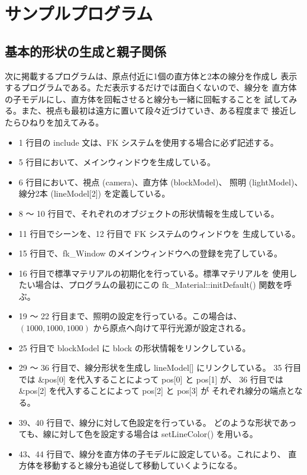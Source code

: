 \chapter{サンプルプログラム} \label{sec:sample}
\section{基本的形状の生成と親子関係}
次に掲載するプログラムは、原点付近に1個の直方体と2本の線分を作成し
表示するプログラムである。ただ表示するだけでは面白くないので、線分を
直方体の子モデルにし、直方体を回転させると線分も一緒に回転することを
試してみる。また、視点も最初は遠方に置いて段々近づけていき、ある程度まで
接近したらひねりを加えてみる。

\begin{itemize}
 \item 1 行目の include 文は、FK システムを使用する場合に必ず記述する。
 \item 5 行目において、メインウィンドウを生成している。
 \item 6 行目において、視点 (camera)、直方体 (blockModel)、
	照明 (lightModel)、線分2本 (lineModel[2]) を定義している。
 \item 8 〜 10 行目で、それぞれのオブジェクトの形状情報を生成している。
 \item 11 行目でシーンを、12 行目で FK システムのウィンドウを
	生成している。
 \item 15 行目で、fk\_Window のメインウィンドウへの登録を完了している。
 \item 16 行目で標準マテリアルの初期化を行っている。標準マテリアルを
	使用したい場合は、プログラムの最初にこの
	fk\_Material::initDefault() 関数を呼ぶ。
 \item 19 〜 22 行目まで、照明の設定を行っている。この場合は、
	\((1000, 1000, 1000)\) から原点へ向けて平行光源が設定される。
 \item 25 行目で blockModel に block の形状情報をリンクしている。
 \item 29 〜 36 行目で、線分形状を生成し lineModel[] にリンクしている。
	35 行目では \&pos[0] を代入することによって pos[0] と pos[1] が、
	36 行目では \&pos[2] を代入することによって pos[2] と pos[3] が
	それぞれ線分の端点となる。
 \item 39、40 行目で、線分に対して色設定を行っている。
	どのような形状であっても、線に対して色を設定する場合は
	setLineColor() を用いる。
 \item 43、44 行目で、線分を直方体の子モデルに設定している。これにより、
	直方体を移動すると線分も追従して移動していくようになる。

\end{itemize}

